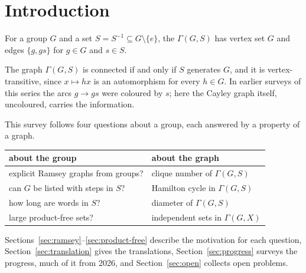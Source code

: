 \section{Introduction}\label{sec:intro}

\begin{definition}\label{def:cayley-graph}
For a group $G$ and a set $S=S^{-1}\subseteq G\setminus\{e\}$, the  $\Gamma(G,S)$ has vertex set $G$ and edges $\{g,gs\}$ for $g\in G$ and $s\in S$.
\end{definition}

The graph $\Gamma(G,S)$ is connected if and only if $S$ generates $G$, and it is vertex-transitive, since $x\mapsto hx$ is an automorphism for every $h\in G$. In earlier surveys of this series the arcs $g\to gs$ were coloured by $s$; here the Cayley graph itself, uncoloured, carries the information.

This survey follows four questions about a group, each answered by a property of a graph.

\begin{center}
\renewcommand{\arraystretch}{1.3}
\begin{tabular}{ll}
\textbf{about the group} & \textbf{about the graph}\\\hline
explicit Ramsey graphs from groups? & clique number of $\Gamma(G,S)$\\
can $G$ be listed with steps in $S$? & Hamilton cycle in $\Gamma(G,S)$\\
how long are words in $S$? & diameter of $\Gamma(G,S)$\\
large product-free sets? & independent sets in $\Gamma(G,X)$
\end{tabular}
\end{center}

Sections~\ref{sec:ramsey}--\ref{sec:product-free} describe the motivation for each question, Section~\ref{sec:translation} gives the translations, Section~\ref{sec:progress} surveys the progress, much of it from 2026, and Section~\ref{sec:open} collects open problems.
